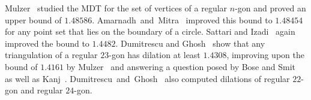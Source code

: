 Mulzer~\cite{mulzer2004minimum} studied the MDT for the set of vertices of a regular $n$-gon and proved an upper bound of $1.48586$. 
Amarnadh~and~Mitra~\cite{DBLP:conf/iccsa/AmarnadhM06} improved this bound to $1.48454$ for any point set that lies on the boundary of a circle.
Sattari and Izadi~\cite{DBLP:journals/comgeo/SattariI19} again improved the bound to $1.4482$.
Dumitrescu and Ghosh~\cite{DBLP:journals/ijcga/DumitrescuG16} show that any triangulation of a regular $23$-gon has dilation at least $1.4308$,
improving upon the bound of $1.4161$ by Mulzer~\cite{mulzer2004minimum} and answering a question posed by Bose and Smit~\cite{DBLP:journals/comgeo/BoseS13} as well as Kanj~\cite{DBLP:conf/iccit/Kanj13}.
Dumitrescu~and~Ghosh~\cite{DBLP:journals/ijcga/DumitrescuG16} also computed dilations of regular $22$-gon and regular $24$-gon.
